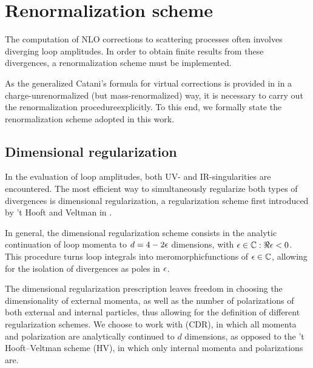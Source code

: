 
\section{Renormalization scheme}

The computation of NLO corrections to scattering processes often involves diverging loop amplitudes. In order to obtain finite results from these divergences, a renormalization scheme must be implemented.

As the generalized Catani's formula for virtual corrections is provided in \cite{Catani-2001} in a charge-unrenormalized (but mass-renormalized) way, it is necessary to carry out the renormalization procedureexplicitly. To this end, we formally state the renormalization scheme adopted in this work.

\subsection{Dimensional regularization}

In the evaluation of loop amplitudes, both UV- and IR-singularities are encountered. The most efficient way to simultaneously regularize both types of divergences is dimensional regularization, a regularization scheme first introduced by 't Hooft and Veltman in \cite{thooft-1972}.

In general, the dimensional regularization scheme consists in the analytic continuation of loop momenta to $ d = 4 - 2 \epsilon $ dimensions, with $ \epsilon \in \mathbb{C} : \Re\epsilon < 0 $. This procedure turns loop integrals into meromorphic\footnotemark functions of $ \epsilon \in \mathbb{C} $, allowing for the isolation of divergences as poles in $ \epsilon $.


The dimensional regularization prescription leaves freedom in choosing the dimensionality of external momenta, as well as the number of polarizations of both external and internal particles, thus allowing for the definition of different regularization schemes. We choose to work with  (CDR), in which all momenta and polarization are analytically continued to $ d $ dimensions, as opposed to the 't Hooft--Veltman scheme (HV), in which only internal momenta and polarizations are.

